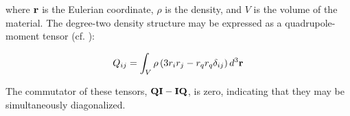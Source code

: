 \documentclass[extra]{gji}
\newif\ifdetail
\begin{document}
where $\bf r$ is the Eulerian coordinate, $\rho$ is the density, and $V$ is the volume of the material.  The degree-two density structure may be expressed as a quadrupole-moment tensor (cf. \citet{jackson1998classical}):

\begin{equation}
Q_{ij} = \int_V \rho \left( 3 r_i r_j - r_q r_q \delta_{ij} \right) d^3 {\bf r}
\end{equation}

The commutator of these tensors, $\bf QI - IQ$, is zero, indicating that they may be simultaneously diagonalized.  

\ifdetail
We may demonstrate that the commutator is zero by using the definition of the commutator and expanding:
\begin{equation} 
\begin{aligned}
{\bf IQ-QI} = &I_{ik} Q_{kj} - Q_{ik} I_{kj} \\
 = &\int_V \rho \left( r_q r_q \delta_{ik} - r_i r_k \right) d^3 {\bf r} \int_V \rho \left( 3 r_k r_j - r_q r_q \delta_{kj} \right) d^3 {\bf r} \\
 &- \int_V \rho \left( r_q r_q \delta_{kj} - r_k r_j \right) d^3 {\bf r} \int_V \rho \left( 3 r_i r_k - r_q r_q \delta_{ik} \right) d^3 {\bf r} \\
 = &3 \delta_{ik} \int_V \rho r_q r_q d^3 {\bf r} \int_V \rho r_k r_j d^3 {\bf r} \\
 &-\delta_{kj} \delta_{ik} \int_V \rho r_q r_q d^3 {\bf r} \int_V \rho r_q r_q d^3 {\bf r} \\
 &-3 \int_V \rho r_i r_k d^3 {\bf r} \int_V \rho r_k r_j d^3 {\bf r} \\
 &+\delta_{kj} \int_V \rho r_i r_k d^3 {\bf r} \int_V \rho r_q r_q d^3 {\bf r} \\
 - &3 \delta_{kj} \int_V \rho r_q r_q d^3 {\bf r} \int_V \rho r_i r_k d^3 {\bf r} \\
 &+\delta_{ik} \delta_{kj} \int_V \rho r_q r_q d^3 {\bf r} \int_V \rho r_q r_q d^3 {\bf r} \\
 &+3 \int_V \rho r_k r_j d^3 {\bf r} \int_V \rho r_i r_k d^3 {\bf r} \\
 &-\delta_{ik} \int_V \rho r_k r_j d^3 {\bf r} \int_V \rho r_q r_q d^3 {\bf r} \\
 = \;&3 \int_V \rho r_q r_q d^3 {\bf r} \int_V \rho r_i r_j d^3 {\bf r} \\
 &+ \int_V \rho r_i r_j d^3 {\bf r} \int_V \rho r_q r_q d^3 {\bf r} \\
 - &3 \int_V \rho r_q r_q d^3 {\bf r} \int_V \rho r_i r_j d^3 {\bf r} \\
 &- \int_V \rho r_i r_j d^3 {\bf r} \int_V \rho r_q r_q d^3 {\bf r} \\
 & = 0
\end{aligned}
\end{equation}
\else
\fi
\end{document}
